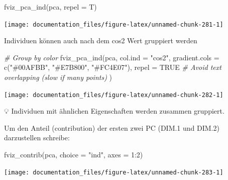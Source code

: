 \documentclass[
]{article}
\newenvironment{Shaded}{\begin{snugshade}}{\end{snugshade}}
\newcommand{\AttributeTok}[1]{\textcolor[rgb]{0.77,0.63,0.00}{#1}}
\newcommand{\CommentTok}[1]{\textcolor[rgb]{0.56,0.35,0.01}{\textit{#1}}}
\newcommand{\ConstantTok}[1]{\textcolor[rgb]{0.00,0.00,0.00}{#1}}
\newcommand{\DecValTok}[1]{\textcolor[rgb]{0.00,0.00,0.81}{#1}}
\newcommand{\FunctionTok}[1]{\textcolor[rgb]{0.00,0.00,0.00}{#1}}
\newcommand{\NormalTok}[1]{#1}
\newcommand{\SpecialCharTok}[1]{\textcolor[rgb]{0.00,0.00,0.00}{#1}}
\newcommand{\StringTok}[1]{\textcolor[rgb]{0.31,0.60,0.02}{#1}}
\begin{document}
\begin{Shaded}
\begin{Highlighting}[]

\FunctionTok{fviz\_pca\_ind}\NormalTok{(pca, }\AttributeTok{repel =}\NormalTok{ T)}
\end{Highlighting}
\end{Shaded}

\begin{center}\texttt{[image: documentation\_files/figure-latex/unnamed-chunk-281-1]} \end{center}

Individuen können auch nach dem cos2 Wert gruppiert werden

\begin{Shaded}
\begin{Highlighting}[]

\CommentTok{\# Group by color}
\FunctionTok{fviz\_pca\_ind}\NormalTok{(pca, }\AttributeTok{col.ind =} \StringTok{"cos2"}\NormalTok{, }
             \AttributeTok{gradient.cols =} \FunctionTok{c}\NormalTok{(}\StringTok{"\#00AFBB"}\NormalTok{, }\StringTok{"\#E7B800"}\NormalTok{, }\StringTok{"\#FC4E07"}\NormalTok{),}
             \AttributeTok{repel =} \ConstantTok{TRUE} \CommentTok{\# Avoid text overlapping (slow if many points)}
\NormalTok{             )}
\end{Highlighting}
\end{Shaded}

\begin{center}\texttt{[image: documentation\_files/figure-latex/unnamed-chunk-282-1]} \end{center}

💡 Individuen mit ähnlichen Eigenschaften werden zusammen gruppiert.

Um den Anteil (contribution) der ersten zwei PC (DIM.1 und DIM.2) darzustellen schreibe:

\begin{Shaded}
\begin{Highlighting}[]

\FunctionTok{fviz\_contrib}\NormalTok{(pca, }\AttributeTok{choice =} \StringTok{"ind"}\NormalTok{, }\AttributeTok{axes =} \DecValTok{1}\SpecialCharTok{:}\DecValTok{2}\NormalTok{)}
\end{Highlighting}
\end{Shaded}

\begin{center}\texttt{[image: documentation\_files/figure-latex/unnamed-chunk-283-1]} \end{center}
\end{document}
